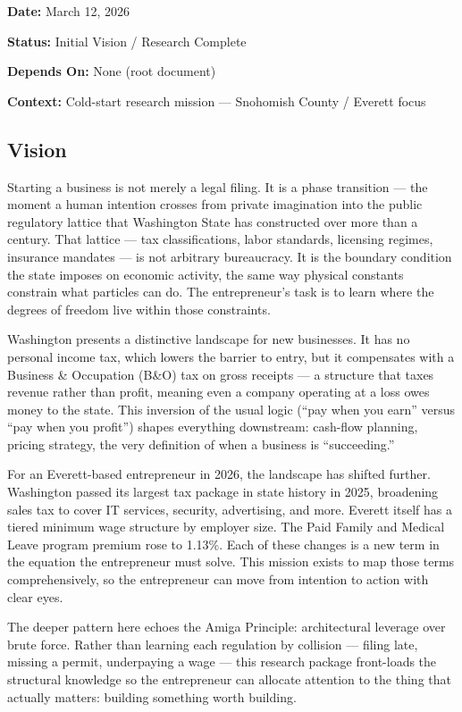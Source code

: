 \documentclass[11pt,letterpaper]{article}
\newcommand{\metafield}[2]{\textbf{\sffamily #1} #2\par}
\begin{document}
\metafield{Date:}{March 12, 2026}
\metafield{Status:}{Initial Vision / Research Complete}
\metafield{Depends On:}{None (root document)}
\metafield{Context:}{Cold-start research mission --- Snohomish County / Everett focus}

\subsection{Vision}

Starting a business is not merely a legal filing. It is a phase transition --- the moment a human intention crosses from private imagination into the public regulatory lattice that Washington State has constructed over more than a century. That lattice --- tax classifications, labor standards, licensing regimes, insurance mandates --- is not arbitrary bureaucracy. It is the boundary condition the state imposes on economic activity, the same way physical constants constrain what particles can do. The entrepreneur's task is to learn where the degrees of freedom live within those constraints.

Washington presents a distinctive landscape for new businesses. It has no personal income tax, which lowers the barrier to entry, but it compensates with a Business \& Occupation (B\&O) tax on gross receipts --- a structure that taxes revenue rather than profit, meaning even a company operating at a loss owes money to the state. This inversion of the usual logic (``pay when you earn'' versus ``pay when you profit'') shapes everything downstream: cash-flow planning, pricing strategy, the very definition of when a business is ``succeeding.''

For an Everett-based entrepreneur in 2026, the landscape has shifted further. Washington passed its largest tax package in state history in 2025, broadening sales tax to cover IT services, security, advertising, and more. Everett itself has a tiered minimum wage structure by employer size. The Paid Family and Medical Leave program premium rose to 1.13\%. Each of these changes is a new term in the equation the entrepreneur must solve. This mission exists to map those terms comprehensively, so the entrepreneur can move from intention to action with clear eyes.

The deeper pattern here echoes the Amiga Principle: architectural leverage over brute force. Rather than learning each regulation by collision --- filing late, missing a permit, underpaying a wage --- this research package front-loads the structural knowledge so the entrepreneur can allocate attention to the thing that actually matters: building something worth building.
\end{document}
